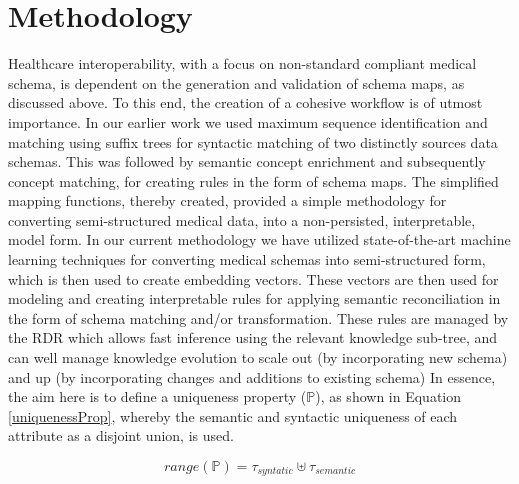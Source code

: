 
\section*{Methodology}
\label{methodology}
Healthcare interoperability, with a focus on non-standard compliant medical schema, is dependent on the generation and validation of schema maps, as discussed above. To this end, the creation of a cohesive workflow is of utmost importance. In our earlier work \cite{Satti2020} we used maximum sequence identification and matching using suffix trees for syntactic matching of two distinctly sources data schemas. This was followed by semantic concept enrichment and subsequently concept matching, for creating rules in the form of schema maps. The simplified mapping functions, thereby created, provided a simple methodology for converting semi-structured medical data, into a non-persisted, interpretable, model form.
In our current methodology we have utilized state-of-the-art machine learning techniques for converting medical schemas into semi-structured form, which is then used to create embedding vectors. These vectors are then used for modeling and creating interpretable rules for applying semantic reconciliation in the form of schema matching and/or transformation. These rules are managed by the RDR which allows fast inference using the relevant knowledge sub-tree, and can well manage knowledge evolution to scale out (by incorporating new schema) and up (by incorporating changes and additions to existing schema)
In essence, the aim here is to define a uniqueness property ($\mathbb{P}$), as shown in Equation \eqref{uniquenessProp}, whereby the semantic and syntactic uniqueness of each attribute as a disjoint union, is used.

\begin{equation}\label{uniquenessProp}
range(\mathbb{P})= \tau_{syntatic} \uplus \tau_{semantic}
\end{equation}

